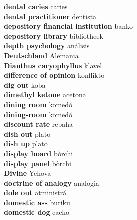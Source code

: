 \textbf{ dental caries  } caries \\
\textbf{ dental practitioner  } dentista \\
\textbf{ depository financial institution  } banko \\
\textbf{ depository library  } bibliotheek \\
\textbf{ depth psychology  } análisis \\
\textbf{ Deutschland  } Alemania \\
\textbf{ Dianthus caryophyllus  } klavel \\
\textbf{ difference of opinion  } konflikto \\
\textbf{ dig out  } koba \\
\textbf{ dimethyl ketone  } acetona \\
\textbf{ dining room  } komedó \\
\textbf{ dining-room  } komedó \\
\textbf{ discount rate  } rebaha \\
\textbf{ dish out  } plato \\
\textbf{ dish up  } plato \\
\textbf{ display board  } bòrchi \\
\textbf{ display panel  } bòrchi \\
\textbf{ Divine  } Yehova \\
\textbf{ doctrine of analogy  } analogia \\
\textbf{ dole out  } atministrá \\
\textbf{ domestic ass  } buriku \\
\textbf{ domestic dog  } cacho \\
